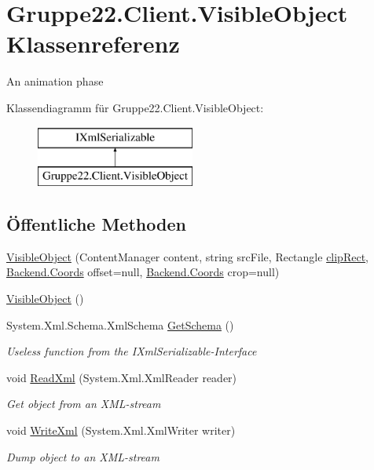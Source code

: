 \hypertarget{class_gruppe22_1_1_client_1_1_visible_object}{\section{Gruppe22.\-Client.\-Visible\-Object Klassenreferenz}
\label{class_gruppe22_1_1_client_1_1_visible_object}
}


An animation phase  


Klassendiagramm für Gruppe22.\-Client.\-Visible\-Object\-:\begin{figure}[H]
\begin{center}
\leavevmode
\includegraphics[height=2.000000cm]{class_gruppe22_1_1_client_1_1_visible_object}
\end{center}
\end{figure}
\subsection*{Öffentliche Methoden}
\begin{DoxyCompactItemize}
\item 
\hyperlink{class_gruppe22_1_1_client_1_1_visible_object_a43956efc6c9987b9d95af3f2d38d1036}{Visible\-Object} (Content\-Manager content, string src\-File, Rectangle \hyperlink{class_gruppe22_1_1_client_1_1_visible_object_acc4d56dcd856ab5fb611f41095947e8d}{clip\-Rect}, \hyperlink{class_gruppe22_1_1_backend_1_1_coords}{Backend.\-Coords} offset=null, \hyperlink{class_gruppe22_1_1_backend_1_1_coords}{Backend.\-Coords} crop=null)
\item 
\hyperlink{class_gruppe22_1_1_client_1_1_visible_object_a947732bfba968cf87c60b9761d26c906}{Visible\-Object} ()
\item 
System.\-Xml.\-Schema.\-Xml\-Schema \hyperlink{class_gruppe22_1_1_client_1_1_visible_object_a21355655f93e280ed6932139b6a0a174}{Get\-Schema} ()
\begin{DoxyCompactList}\small\item\em Useless function from the I\-Xml\-Serializable-\/\-Interface \end{DoxyCompactList}\item 
void \hyperlink{class_gruppe22_1_1_client_1_1_visible_object_a80228a0a566444d0e24582541d6060ab}{Read\-Xml} (System.\-Xml.\-Xml\-Reader reader)
\begin{DoxyCompactList}\small\item\em Get object from an X\-M\-L-\/stream \end{DoxyCompactList}\item 
void \hyperlink{class_gruppe22_1_1_client_1_1_visible_object_a34ec536df49c90fd8b476ac9d0cbcebf}{Write\-Xml} (System.\-Xml.\-Xml\-Writer writer)
\begin{DoxyCompactList}\small\item\em Dump object to an X\-M\-L-\/stream \end{DoxyCompactList}\end{DoxyCompactItemize}
